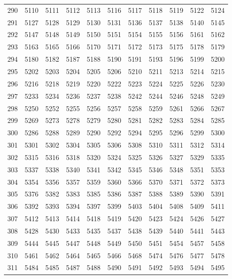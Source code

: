 \begin{longtable}{|r|rrrrrrrrrr|}
  290 & 5110 & 5111 & 5112 & 5113 & 5116 & 5117 & 5118 & 5119 & 5122 & 5124 \\ 
  291 & 5127 & 5128 & 5129 & 5130 & 5131 & 5136 & 5137 & 5138 & 5140 & 5145 \\ 
  292 & 5147 & 5148 & 5149 & 5150 & 5151 & 5154 & 5155 & 5156 & 5161 & 5162 \\ 
  293 & 5163 & 5165 & 5166 & 5170 & 5171 & 5172 & 5173 & 5175 & 5178 & 5179 \\ 
  294 & 5180 & 5182 & 5187 & 5188 & 5190 & 5191 & 5193 & 5196 & 5199 & 5200 \\ 
  295 & 5202 & 5203 & 5204 & 5205 & 5206 & 5210 & 5211 & 5213 & 5214 & 5215 \\ 
  296 & 5216 & 5218 & 5219 & 5220 & 5222 & 5223 & 5224 & 5225 & 5226 & 5230 \\ 
  297 & 5233 & 5234 & 5236 & 5237 & 5238 & 5242 & 5244 & 5246 & 5248 & 5249 \\ 
  298 & 5250 & 5252 & 5255 & 5256 & 5257 & 5258 & 5259 & 5261 & 5266 & 5267 \\ 
  299 & 5269 & 5273 & 5278 & 5279 & 5280 & 5281 & 5282 & 5283 & 5284 & 5285 \\ 
  300 & 5286 & 5288 & 5289 & 5290 & 5292 & 5294 & 5295 & 5296 & 5299 & 5300 \\ 
  301 & 5301 & 5302 & 5304 & 5305 & 5306 & 5308 & 5310 & 5311 & 5312 & 5314 \\ 
  302 & 5315 & 5316 & 5318 & 5320 & 5324 & 5325 & 5326 & 5327 & 5329 & 5335 \\ 
  303 & 5337 & 5338 & 5340 & 5341 & 5342 & 5345 & 5346 & 5348 & 5351 & 5353 \\ 
  304 & 5354 & 5356 & 5357 & 5359 & 5360 & 5366 & 5370 & 5371 & 5372 & 5373 \\ 
  305 & 5376 & 5382 & 5383 & 5385 & 5386 & 5387 & 5388 & 5389 & 5390 & 5391 \\ 
  306 & 5392 & 5393 & 5394 & 5397 & 5399 & 5403 & 5404 & 5408 & 5409 & 5411 \\ 
  307 & 5412 & 5413 & 5414 & 5418 & 5419 & 5420 & 5423 & 5424 & 5426 & 5427 \\ 
  308 & 5428 & 5430 & 5433 & 5435 & 5437 & 5438 & 5439 & 5440 & 5441 & 5443 \\ 
  309 & 5444 & 5445 & 5447 & 5448 & 5449 & 5450 & 5451 & 5454 & 5457 & 5458 \\ 
  310 & 5461 & 5462 & 5464 & 5465 & 5466 & 5468 & 5474 & 5476 & 5477 & 5478 \\ 
  311 & 5484 & 5485 & 5487 & 5488 & 5490 & 5491 & 5492 & 5493 & 5494 & 5495 \\ 

\end{longtable}
